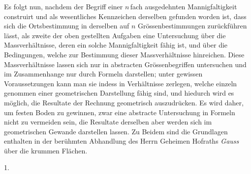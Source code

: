 \documentclass[a4paper,12pt]{article}
\begin{document}
Es folgt nun, nachdem der Begriff einer $n \,$\-fach ausgedehnten
Mannigfaltigkeit construirt und als wesentliches Kennzeichen
derselben gefunden worden ist, dass sich die Ortsbestimmung in
derselben auf $n$ Gr\"{o}ssenbestimmungen zur\"{u}ckf\"{u}hren
l\"{a}sst, als zweite der oben gestellten Aufgaben eine
Untersuchung \"{u}ber die Massverh\"{a}ltnisse, deren ein solche
Mannigfaltigkeit f\"{a}hig ist, und \"{u}ber die Bedingungen,
welche zur Bestimmung dieser Massverh\"{a}ltnisse hinreichen.
Diese Massverh\"{a}ltnisse lassen sich nur in abstracten
Gr\"{o}ssenbegriffen untersuchen und im Zusammenhange nur durch
Formeln darstellen; unter gewissen Voraussetzungen kann man sie
indess in Verh\"{a}ltnisse zerlegen, welche einzeln genommen
einer geometrischen Darstellung f\"{a}hig sind, und hiedurch wird
es m\"{o}glich, die Resultate der Rechnung geometrisch
auszudr\"{u}cken.  Es wird daher, um festen Boden zu gewinnen,
zwar eine abstracte Untersuchung in Formeln nicht zu vermeiden
sein, die Resultate derselben aber werden sich im geometrischen
Gewande darstellen lassen.  Zu Beidem sind die Grundlagen
enthalten in der ber\"{u}hmten Abhandlung des Herrn Geheimen
Hofraths \emph{Gauss} \"{u}ber die krummen Fl\"{a}chen.

\medbreak

\centerline{1.}

\nobreak\medskip
\end{document}
